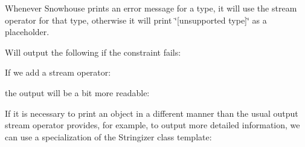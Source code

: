 Whenever Snowhouse prints an error message for a type, it will use the stream operator for that type, otherwise it will print \char`\"{}\mbox{[}unsupported type\mbox{]}\char`\"{} as a placeholder.


\begin{DoxyCode}{0}
\DoxyCodeLine{}
\end{DoxyCode}


Will output the following if the constraint fails\+:


\begin{DoxyCode}{0}
\end{DoxyCode}


If we add a stream operator\+:


\begin{DoxyCode}{0}
\DoxyCodeLine{\{}
\DoxyCodeLine{\}}
\end{DoxyCode}


the output will be a bit more readable\+:


\begin{DoxyCode}{0}
\end{DoxyCode}


If it is necessary to print an object in a different manner than the usual output stream operator provides, for example, to output more detailed information, we can use a specialization of the {\ttfamily Stringizer} class template\+:


